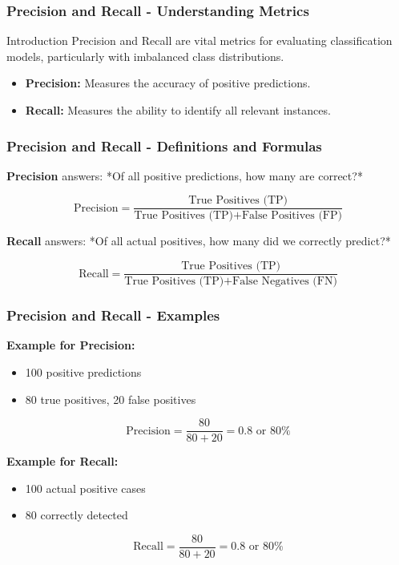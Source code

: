 \documentclass[aspectratio=169]{beamer}
\begin{document}
\begin{frame}[fragile]
    \frametitle{Precision and Recall - Understanding Metrics}
    \begin{block}{Introduction}
        Precision and Recall are vital metrics for evaluating classification models, particularly with imbalanced class distributions.
    \end{block}
    
    \begin{itemize}
        \item \textbf{Precision:} Measures the accuracy of positive predictions.
        \item \textbf{Recall:} Measures the ability to identify all relevant instances.
    \end{itemize}
\end{frame}

\begin{frame}[fragile]
    \frametitle{Precision and Recall - Definitions and Formulas}
    
    \textbf{Precision} answers: *Of all positive predictions, how many are correct?*
    
    \begin{equation}
        \text{Precision} = \frac{\text{True Positives (TP)}}{\text{True Positives (TP)} + \text{False Positives (FP)}}
    \end{equation}
    
    \textbf{Recall} answers: *Of all actual positives, how many did we correctly predict?*
    
    \begin{equation}
        \text{Recall} = \frac{\text{True Positives (TP)}}{\text{True Positives (TP)} + \text{False Negatives (FN)}}
    \end{equation}
\end{frame}

\begin{frame}[fragile]
    \frametitle{Precision and Recall - Examples}
    
    \textbf{Example for Precision:} 
    \begin{itemize}
        \item 100 positive predictions
        \item 80 true positives, 20 false positives
    \end{itemize}
    \begin{equation}
        \text{Precision} = \frac{80}{80 + 20} = 0.8 \text{ or } 80\%
    \end{equation}

    \textbf{Example for Recall:}
    \begin{itemize}
        \item 100 actual positive cases
        \item 80 correctly detected
    \end{itemize}
    \begin{equation}
        \text{Recall} = \frac{80}{80 + 20} = 0.8 \text{ or } 80\%
    \end{equation}
\end{frame}
\end{document}
